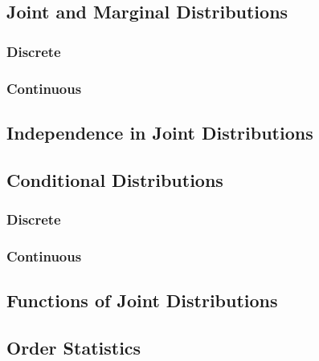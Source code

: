 \documentclass[a4paper,10pt]{article}
\begin{document}
\subsection{Joint and Marginal Distributions}
\subsubsection{Discrete}
\subsubsection{Continuous}

\subsection{Independence in Joint Distributions}

\subsection{Conditional Distributions}
\subsubsection{Discrete}
\subsubsection{Continuous}

\subsection{Functions of Joint Distributions}

\subsection{Order Statistics}
\end{document}
